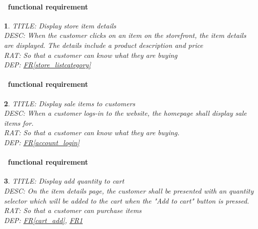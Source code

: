 \documentclass{scrreprt}
\theoremstyle{funreq}
\newtheorem{funreq}{}
\newcommand*{\reqref}[1]{\hyperref[#1]{FR\ref*{#1}}}
\begin{document}
\paragraph[]{\Subsectionname ~functional requirement }
\begin{funreq}
	\label{store_details}
	TITLE: Display store item details\\
	DESC: When the customer clicks on an item on the storefront, the item details are displayed.  The details include a product description and price\\
	RAT: So that a customer can know what they are buying\\
	DEP: \reqref{store_listcategory}\\
\end{funreq}

\paragraph[]{\Subsectionname ~functional requirement }
\begin{funreq}
	\label{store_displaysales}
	TITLE: Display sale items to customers\\
	DESC: When a customer logs-in to the website, the homepage shall display sale items for.\\
	RAT: So that a customer can know what they are buying.\\
	DEP: \reqref{account_login}\\
\end{funreq}

\paragraph[]{\Subsectionname ~functional requirement }
\begin{funreq}
	\label{store_detailscart}
	TITLE: Display add quantity to cart\\
	DESC: On the item details page, the customer shall be presented with an quantity selector which will be added to the cart when the "Add to cart" button is pressed.\\
	RAT: So that a customer can purchase items\\
	DEP: \reqref{cart_add}, \reqref{store_details}\\
\end{funreq}
\end{document}
